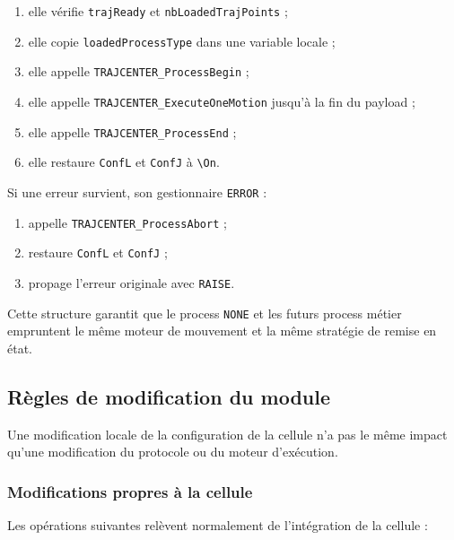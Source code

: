\documentclass{rapportENSAM}
\begin{document}
\begin{enumerate}
    \item elle vérifie \texttt{trajReady} et
    \texttt{nbLoadedTrajPoints} ;
    \item elle copie \texttt{loadedProcessType} dans une variable locale ;
    \item elle appelle \texttt{TRAJCENTER\_ProcessBegin} ;
    \item elle appelle \texttt{TRAJCENTER\_ExecuteOneMotion} jusqu'à la fin du
    payload ;
    \item elle appelle \texttt{TRAJCENTER\_ProcessEnd} ;
    \item elle restaure \texttt{ConfL} et \texttt{ConfJ} à
    \texttt{\textbackslash On}.
\end{enumerate}

Si une erreur survient, son gestionnaire \texttt{ERROR} :

\begin{enumerate}
    \item appelle \texttt{TRAJCENTER\_ProcessAbort} ;
    \item restaure \texttt{ConfL} et \texttt{ConfJ} ;
    \item propage l'erreur originale avec \texttt{RAISE}.
\end{enumerate}

Cette structure garantit que le process \texttt{NONE} et les futurs process
métier empruntent le même moteur de mouvement et la même stratégie de remise en
état.


\subsection{Règles de modification du module}
\label{subsec:rapid-module-modification-rules}

Une modification locale de la configuration de la cellule n'a pas le même
impact qu'une modification du protocole ou du moteur d'exécution.


\subsubsection{Modifications propres à la cellule}
\label{subsubsec:rapid-cell-local-changes}

Les opérations suivantes relèvent normalement de l'intégration de la cellule :
\end{document}

